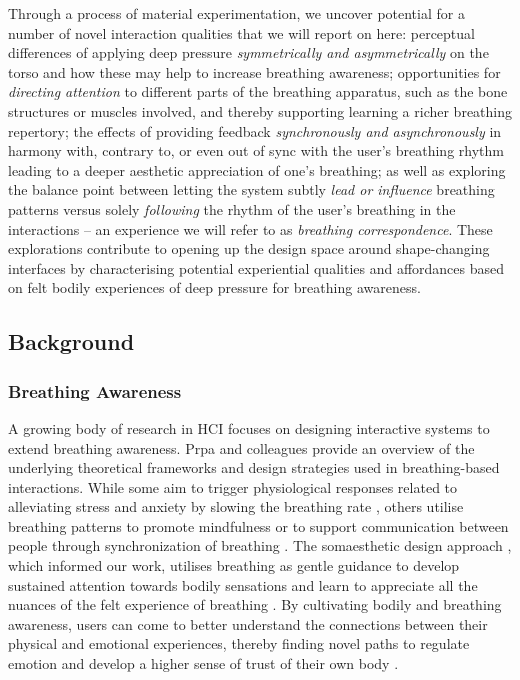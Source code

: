 Through a process of material experimentation, we uncover potential for a number of novel interaction qualities that we will report on here: perceptual differences of applying deep pressure \textit{symmetrically and asymmetrically} on the torso and how these may help to increase breathing awareness; opportunities for \textit{directing attention} to different parts of the breathing apparatus, such as the bone structures or muscles involved, and thereby supporting learning a richer breathing repertory; the effects of providing feedback \textit{synchronously and asynchronously} in harmony with, contrary to, or even out of sync with the user's breathing rhythm leading to a deeper aesthetic appreciation of one's breathing; as well as exploring the balance point between letting the system subtly \textit{lead or influence} breathing patterns versus solely \textit{following} the rhythm of the user's breathing in the interactions -- an experience we will refer to as \textit{breathing correspondence}. These explorations contribute to opening up the design space around shape-changing interfaces by characterising potential experiential qualities and affordances based on felt bodily experiences of deep pressure for breathing awareness.


\subsection{Background}

\subsubsection{Breathing Awareness}

A growing body of research in HCI focuses on designing interactive systems to extend breathing awareness. Prpa and colleagues \cite{prpa_inhaling_2020} provide an overview of the underlying theoretical frameworks and design strategies used in breathing-based interactions. While some aim to trigger physiological responses related to alleviating stress and anxiety by slowing the breathing rate \cite{van_rooij_deep_2016, bumatay_investigating_2017, parnandi_chill-out_2014}, others utilise breathing patterns to promote mindfulness \cite{pisa_towards_2017, shamekhi_breathe_2018} or to support communication between people through synchronization of breathing \cite{desnoyers-stewart_jel_2019,kim_breathingframe_2015}. The somaesthetic design approach \cite{hook_designing_2018}, which informed our work, utilises breathing as gentle guidance to develop sustained attention towards bodily sensations and learn to appreciate all the nuances of the felt experience of breathing \cite{prpa_attending_2018, stahl_soma_2016}. By cultivating bodily and breathing awareness, users can come to better understand the connections between their physical and emotional experiences, thereby finding novel paths to regulate emotion and develop a higher sense of trust of their own body \cite{bornemann_differential_2015}.

